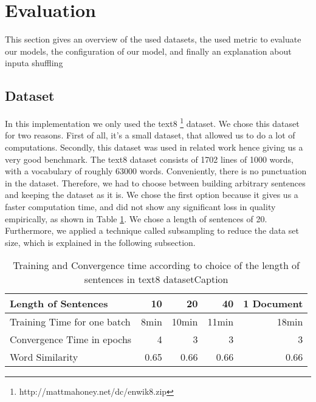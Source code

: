 \section{Evaluation}\label{sec:evaluation}


This section gives an overview of the used datasets, the used metric to evaluate our models, the configuration of our model, and finally an explanation about inputa shuffling

\subsection{Dataset}\label{sec:dataset}
In this implementation we only used the text8 \footnote{http://mattmahoney.net/dc/enwik8.zip} dataset. We chose this dataset for two reasons. First of all, it's a small dataset, that allowed us to do a lot of computations. Secondly, this dataset was used in related work \cite{intel} hence giving us a very good benchmark. The text8 dataset consists of 1702 lines of 1000 words, with a vocabulary of roughly 63000 words. Conveniently, there is no punctuation in the dataset. Therefore, we had to choose between building arbitrary sentences and keeping the dataset as it is. We chose the first option because it gives us a faster computation time, and did not show any significant loss in quality empirically, as shown in Table \ref{table:with_20}. We chose a length of sentences of 20. Furthermore, we applied a technique called subsampling to reduce the data set size, which is explained in the following subsection.

\begin{table}[tb]
    \caption{Training and Convergence time according to choice of the length of sentences in text8 datasetCaption}
    \begin{tabular}{l r r r r}%
        \toprule
          Length of Sentences & 10 & 20 & 40 & 1 Document \\ 

        \midrule%
Training Time for one batch &8min & 10min & 11min & 18min \\ 
Convergence Time in epochs &4  & 3  & 3  & 3  \\ 
Word Similarity& 0.65 & 0.66 & 0.66 & 0.66 \\ \hline
        \midrule%
   \end{tabular}%
   \label{table:with_20}%
\end{table}


